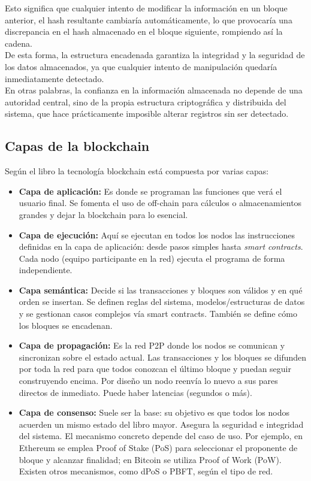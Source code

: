 Esto significa que cualquier intento de modificar la información en un bloque anterior, el hash resultante cambiaría automáticamente,
lo que provocaría una discrepancia en el hash almacenado en el bloque siguiente, rompiendo así la cadena.\\

De esta forma, la estructura encadenada garantiza la integridad y la seguridad de los datos almacenados, ya que cualquier
intento de manipulación quedaría inmediatamente detectado.\\

En otras palabras, la confianza en la información almacenada no depende de una autoridad central, sino de la propia
estructura criptográfica y distribuida del sistema, que hace prácticamente imposible alterar registros sin ser detectado.

\subsection{Capas de la blockchain}
Según el libro \textcite{preukschat2017blockchain} la tecnología blockchain está compuesta por varias capas:
\begin{itemize}
    \item \textbf{Capa de aplicación:} Es donde se programan las funciones que verá el usuario final. Se fomenta el uso de off-chain para cálculos o almacenamientos grandes y dejar la blockchain para lo esencial.
    \item \textbf{Capa de ejecución:} Aquí se ejecutan en todos los nodos las instrucciones definidas en la capa de aplicación: desde pasos simples hasta \textit{smart contracts}. Cada nodo (equipo participante en la red) ejecuta el programa de forma independiente.
    \item \textbf{Capa semántica:} Decide si las transacciones y bloques son válidos y en qué orden se insertan. Se definen reglas del sistema, modelos/estructuras de datos y se gestionan casos complejos vía smart contracts. También se define cómo los bloques se encadenan.
    \item \textbf{Capa de propagación:} Es la red P2P donde los nodos se comunican y sincronizan sobre el estado actual. Las transacciones y los bloques se difunden por toda la red para que todos conozcan el último bloque y puedan seguir construyendo encima. Por diseño un nodo reenvía lo nuevo a sus pares directos de inmediato. Puede haber latencias (segundos o más).
    \item \textbf{Capa de consenso:} Suele ser la base: su objetivo es que todos los nodos acuerden un mismo estado del libro mayor. Asegura la seguridad e integridad del sistema. El mecanismo concreto depende del caso de uso. Por ejemplo, en Ethereum se emplea Proof of Stake (PoS) para seleccionar el proponente de bloque y alcanzar finalidad; en Bitcoin se utiliza Proof of Work (PoW). Existen otros mecanismos, como dPoS o PBFT, según el tipo de red.
\end{itemize}    

